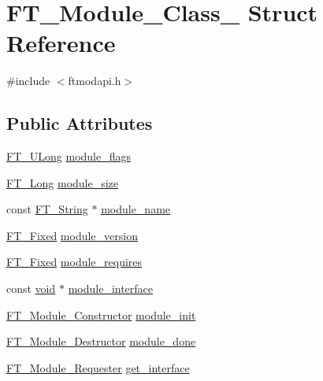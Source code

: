 \hypertarget{struct_f_t___module___class__}{\section{F\-T\-\_\-\-Module\-\_\-\-Class\-\_\- Struct Reference}
\label{struct_f_t___module___class__}
}


{\ttfamily \#include $<$ftmodapi.\-h$>$}

\subsection*{Public Attributes}
\begin{DoxyCompactItemize}
\item 
\hyperlink{fttypes_8h_a4fac88bdba78eb76b505efa6e4fbf3f5}{F\-T\-\_\-\-U\-Long} \hyperlink{struct_f_t___module___class___a54a02a3767955cd8fa0cd786bd1f9515}{module\-\_\-flags}
\item 
\hyperlink{fttypes_8h_a7fa72a1f0e79fb1860c5965789024d6f}{F\-T\-\_\-\-Long} \hyperlink{struct_f_t___module___class___a2582eeab364e4fbbd5d1e420bfcf3207}{module\-\_\-size}
\item 
const \hyperlink{fttypes_8h_a9846214585359eb2ba6bbb0e6de30639}{F\-T\-\_\-\-String} $\ast$ \hyperlink{struct_f_t___module___class___af25b9e32b6c91e0c31560efb62886ed7}{module\-\_\-name}
\item 
\hyperlink{fttypes_8h_a5f5a679cc09f758efdd0d1c5feed3c3d}{F\-T\-\_\-\-Fixed} \hyperlink{struct_f_t___module___class___a5b649f1965c42fd8c54bbc370fbf60b4}{module\-\_\-version}
\item 
\hyperlink{fttypes_8h_a5f5a679cc09f758efdd0d1c5feed3c3d}{F\-T\-\_\-\-Fixed} \hyperlink{struct_f_t___module___class___a24772981bd972d342f54a6e1704f85c3}{module\-\_\-requires}
\item 
const \hyperlink{wglew_8h_aeea6e3dfae3acf232096f57d2d57f084}{void} $\ast$ \hyperlink{struct_f_t___module___class___a320168f227e2d268691429ac0c6b2900}{module\-\_\-interface}
\item 
\hyperlink{ftmodapi_8h_ad4ef5dba347f945c2da944730c74cc35}{F\-T\-\_\-\-Module\-\_\-\-Constructor} \hyperlink{struct_f_t___module___class___a60f2bb9eee68366f20fe0613f347ffbd}{module\-\_\-init}
\item 
\hyperlink{ftmodapi_8h_a5ca3f2f7dea62f52c2735ace463c63d3}{F\-T\-\_\-\-Module\-\_\-\-Destructor} \hyperlink{struct_f_t___module___class___ab6e9c780519e24a51144df79692cf339}{module\-\_\-done}
\item 
\hyperlink{ftmodapi_8h_a7862753074f0f521aaedd68a26a08a1f}{F\-T\-\_\-\-Module\-\_\-\-Requester} \hyperlink{struct_f_t___module___class___aa72d79fcd0991231e24e88f359244e8e}{get\-\_\-interface}
\end{DoxyCompactItemize}


